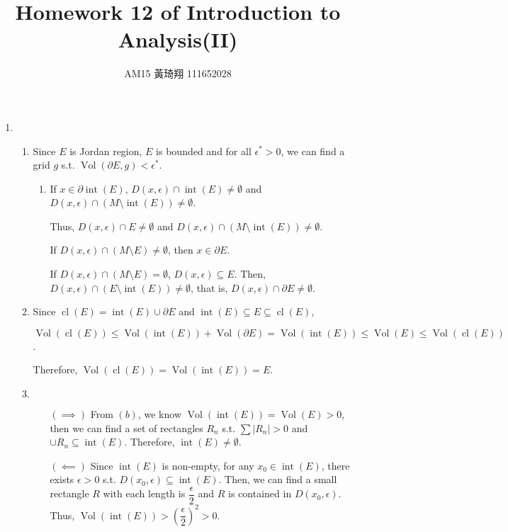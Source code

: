 \documentclass[12pt]{article}
\title{Homework 12 of Introduction to Analysis(II)}
\author{AM15 黃琦翔 111652028}
\DeclareMathOperator{\volume}{Vol}
\DeclareMathOperator{\interior}{int}
\DeclareMathOperator{\closure}{cl}
\newcommand{\boundary}{\partial}
\begin{document}
\maketitle
\begin{enumerate}
    \item \begin{enumerate}
        \item Since $E$ is Jordan region, $E$ is bounded and for all $\epsilon^* > 0$, we can find a grid $g$ s.t. $\volume(\partial E, g) < \epsilon^*$.
        \begin{enumerate}
            \item If $x\in \boundary\interior(E)$, $D(x, \epsilon) \cap \interior(E) \neq \emptyset$ and $D(x, \epsilon) \cap (M\setminus \interior(E)) \neq \emptyset$.
            
            Thus, $D(x, \epsilon)\cap E \neq \emptyset$ and $D(x,\epsilon) \cap (M\setminus \interior(E)) \neq \emptyset$.

            If $D(x, \epsilon) \cap (M\setminus E) \neq \emptyset$, then $x\in \partial E$.

            If $D(x, \epsilon) \cap (M\setminus E) = \emptyset$, $D(x, \epsilon) \subseteq E$.
            Then, $D(x, \epsilon) \cap (E\setminus \interior(E)) \neq \emptyset$,
            that is, $D(x, \epsilon) \cap \partial E \neq \emptyset$.

        \end{enumerate}

        \item Since $\closure(E) = \interior(E) \cup \boundary E$ and $\interior(E)\subseteq E \subseteq \closure(E)$,

        $\volume(\closure(E)) \leq \volume(\interior(E)) + \volume(\boundary E) = \volume(\interior(E))\leq \volume(E) \leq \volume(\closure(E))$.

        Therefore, $\volume(\closure(E)) = \volume(\interior(E)) = E$.

        \item $\ $
        \begin{enumerate}
            \item[$(\implies)$] From $(b)$, we know $\volume(\interior(E)) = \volume(E) > 0$, 
            then we can find a set of rectangles $R_n$ s.t. $\sum |R_n| > 0$ and $\cup R_n \subseteq \interior(E)$.
            Therefore, $\interior(E) \neq \emptyset$.

            \item[$(\impliedby)$] Since $\interior(E)$ is non-empty, for any $x_0\in \interior(E)$, there exists $\epsilon > 0$ s.t. $D(x_0, \epsilon) \subseteq \interior(E)$.
            Then, we can find a small rectangle $R$ with each length is $\dfrac{\epsilon}{2}$ and $R$ is contained in $D(x_0, \epsilon)$.
            Thus, $\volume(\interior(E)) > \left(\dfrac{\epsilon}{2}\right)^2 > 0$.
        \end{enumerate}


\end{enumerate}
\end{enumerate}
\end{document}

